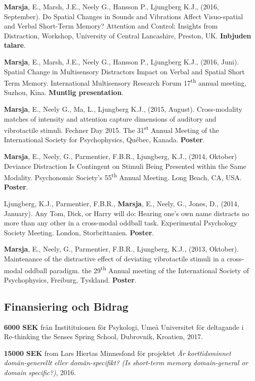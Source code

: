\documentclass[]{article}
\begin{document}
\textbf{Marsja}, E., Marsh, J.E., Neely G., Hansson P., Ljungberg K.J.,
(2016, September). Do Spatial Changes in Sounds and Vibrations Affect
Visuo-spatial and Verbal Short-Term Memory? Attention and Control:
Insights from Distraction, Workshop, University of Central Lancashire,
Preston, UK. \textbf{Inbjuden talare}.

\textbf{Marsja}, E., Marsh, J.E., Neely G., Hansson P., Ljungberg K.J.,
(2016, Juni). Spatial Change in Multisensory Distractors Impact on
Verbal and Spatial Short Term Memory. International Multisensory
Research Forum 17\textsuperscript{th} annual meeting, Suzhou, Kina.
\textbf{Muntlig presentation}.

\textbf{Marsja}, E., Neely G., Ma, L., Ljungberg K.J., (2015, August).
Cross-modality matches of intensity and attention capture dimensions of
auditory and vibrotactile stimuli. Fechner Day 2015. The
31\textsuperscript{st} Annual Meeting of the International Society for
Psychophysics, Québec, Kanada. \textbf{Poster}.

\textbf{Marsja}, E., Neely, G., Parmentier, F.B.R., Ljungberg, K.J.,
(2014, Oktober) Deviance Distraction Is Contingent on Stimuli Being
Presented within the Same Modality. Psychonomic Society's
55\textsuperscript{th} Annual Meeting. Long Beach, CA, USA.
\textbf{Poster}.

Ljungberg, K.J., Parmentier, F.B.R., \textbf{Marsja}, E., Neely, G.,
Jones, D., (2014, January). Any Tom, Dick, or Harry will do: Hearing
one's own name distracts no more than any other in a cross-modal oddball
task. Experimental Psychology Society Meeting. London, Storbrittanien.
\textbf{Poster}.

\textbf{Marsja}, E., Neely, G., Parmentier, F.B.R., Ljungberg, K.J.,
(2013, Oktober). Maintenance of the distractive effect of deviating
vibrotactile stimuli in a cross-modal oddball paradigm. the
29\textsuperscript{th} Annual meeting of the International Society of
Psychophysics, Freiburg, Tyskland. \textbf{Poster}.

\subsection{Finansiering och Bidrag}\label{finansiering-och-bidrag}

\textbf{6000 SEK} från Institituionen för Psykologi, Umeå Universitet
för deltagande i Re-thinking the Senses Spring School, Dubrovnik,
Kroatien, 2017.

\textbf{15000 SEK} from Lars Hiertas Minnesfond för projektet \emph{Är
korttidsminnet domän-generellt eller domän-specifikt? (Is short-term
memory domain-general or domain specific?)}, 2016.
\end{document}
